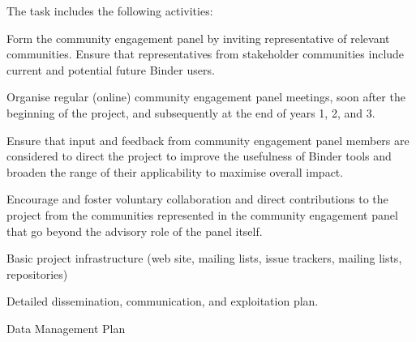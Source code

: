 \begin{workpackage}[id=management,type=MGT,wphases=0-36!.25,
  title=Project Management,
  short=Management,
  lead=SRL,
  MPRM=1,
  QSRM=1,
  IFRRM=1,
  UIORM=1,
  SRLRM=12,
  swsites
]
\begin{tasklist}
\begin{task}[
  title=Community Engagement Panel,
  id=community-engagement-panel,
  lead=SRL,
  PM=2,
  wphases={0-36!.056},
  partners={MP,QS,UIO,IFR},
  ]

The task includes the following activities:
\begin{compactenum}
\item Form the community engagement panel by inviting representative of relevant
  communities. Ensure that representatives from stakeholder communities include
  current and potential future Binder users.
\item Organise regular (online) community engagement panel meetings, soon after the
  beginning of the project, and subsequently at the end of years 1, 2, and 3.
\item Ensure that input and feedback from community engagement panel members are
  considered to direct the project to improve the usefulness of Binder tools
  and broaden the range of their applicability to maximise overall impact.
\item Encourage and foster voluntary collaboration and direct contributions to
  the project from the communities represented in the community engagement
  panel that go beyond the advisory role of the panel itself.
\end{compactenum}

\end{task}
\end{tasklist}


\begin{wpdelivs}

\begin{wpdeliv}[due=2,miles=startup,id=infrastructure,dissem=PU,nature=DEC,lead=SRL]
  {Basic project infrastructure (web site, mailing lists, issue trackers, mailing lists, repositories)}
\end{wpdeliv}


  \begin{wpdeliv}[due=3,id=dissemination-plan,dissem=PU,nature=R,lead=SRL]
    {Detailed dissemination, communication, and exploitation plan.}
  \end{wpdeliv}


\begin{wpdeliv}[due=6,miles=startup,id=data-management-plan,dissem=PU,nature=DMP,lead=SRL]
  {Data Management Plan}
\end{wpdeliv}


\end{wpdelivs}
\end{workpackage}
